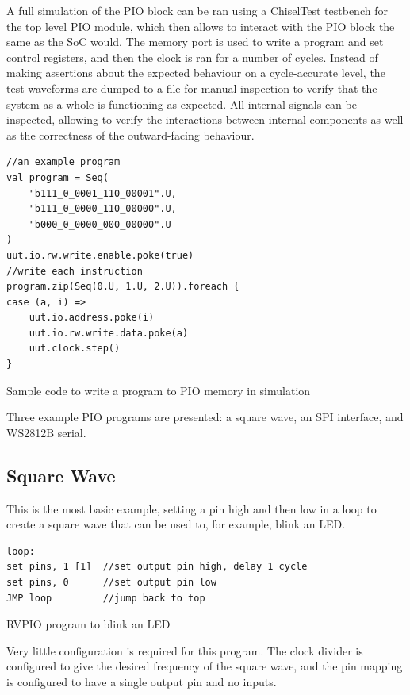 A full simulation of the PIO block can be ran using a ChiselTest testbench for the top level PIO module, which then allows to interact with the PIO block the same as the SoC would. The memory port is used to write a program and set control registers, and then the clock is ran for a number of cycles. Instead of making assertions about the expected behaviour on a cycle-accurate level, the test waveforms are dumped to a file for manual inspection to verify that the system as a whole is functioning as expected. All internal signals can be inspected, allowing to verify the interactions between internal components as well as the correctness of the outward-facing behaviour.

\begin{listing}[h!]
    \begin{verbatim}
//an example program
val program = Seq(
    "b111_0_0001_110_00001".U,
    "b111_0_0000_110_00000".U, 
    "b000_0_0000_000_00000".U  
)
uut.io.rw.write.enable.poke(true)
//write each instruction
program.zip(Seq(0.U, 1.U, 2.U)).foreach {
case (a, i) =>
    uut.io.address.poke(i)
    uut.io.rw.write.data.poke(a)
    uut.clock.step()
}
    \end{verbatim}
    \caption{Sample code to write a program to PIO memory in simulation}
    \label{lst:sim-write-prog}
\end{listing}

Three example PIO programs are presented: a square wave, an SPI interface, and WS2812B serial.

\subsection{Square Wave}
\label{sec:blink-sim}

This is the most basic example, setting a pin high and then low in a loop to create a square wave that can be used to, for example, blink an LED.

\begin{listing}[h!]
    \begin{verbatim}
loop:
set pins, 1 [1]  //set output pin high, delay 1 cycle
set pins, 0      //set output pin low
JMP loop         //jump back to top
    \end{verbatim}
    \caption{RVPIO program to blink an LED}
    \label{lst:blinky}
\end{listing}

Very little configuration is required for this program. The clock divider is configured to give the desired frequency of the square wave, and the pin mapping is configured to have a single output pin and no inputs.

